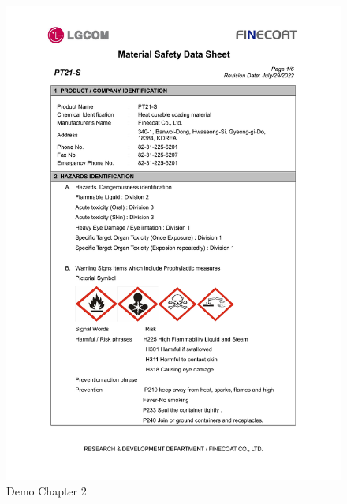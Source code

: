 \documentclass[a4paper,12pt,twoside]{report}
\begin{document}
\begin{figure}[H]
		\includegraphics[width=\textwidth, keepaspectratio]{images/chaps1}
	\caption[chaps123]{Demo Chapter 2}
\label{chaps1}
\end{figure}
\end{document}
